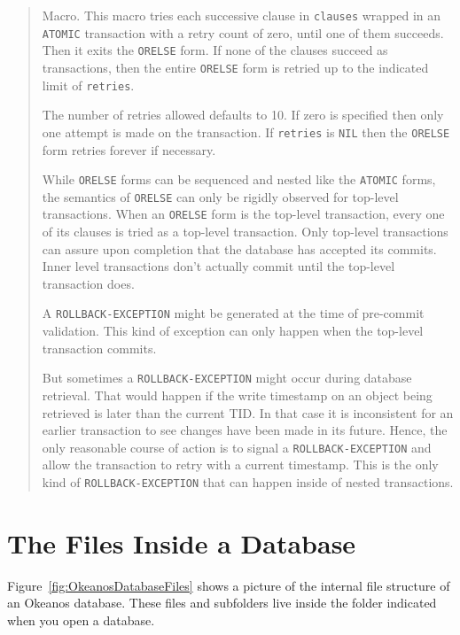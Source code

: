 \documentclass[article,oneside]{memoir}
\begin{document}
\begin{quote}

Macro. This macro tries each successive clause in \texttt{clauses} wrapped in an \texttt{ATOMIC} transaction with a retry count of zero, until one of them succeeds. Then it exits the \texttt{ORELSE} form. If none of the clauses succeed as transactions, then the entire \texttt{ORELSE} form is retried up to the indicated limit of \texttt{retries}.

The number of retries allowed defaults to 10. If zero is specified then only one attempt is made on the transaction. If \texttt{retries} is \texttt{NIL} then the \texttt{ORELSE} form retries forever if necessary.

While \texttt{ORELSE} forms can be sequenced and nested like the \texttt{ATOMIC} forms, the semantics of \texttt{ORELSE} can only be rigidly observed for top-level transactions. When an \texttt{ORELSE} form is the top-level transaction, every one of its clauses is tried as a top-level transaction. Only top-level transactions can assure upon completion that the database has accepted its commits. Inner level transactions don't actually commit until the top-level transaction does.

A \texttt{ROLLBACK-EXCEPTION} might be generated at the time of pre-commit validation. This kind of exception can only happen when the top-level transaction commits. 

But sometimes a  \texttt{ROLLBACK-EXCEPTION} might occur during database retrieval. That would happen if the write timestamp on an object being retrieved is later than the current TID. In that case it is inconsistent for an earlier transaction to see changes have been made in its future. Hence, the only reasonable course of action is to signal a \texttt{ROLLBACK-EXCEPTION} and allow the transaction to retry with a current timestamp. This is the only kind of \texttt{ROLLBACK-EXCEPTION} that can happen inside of nested transactions.
\end{quote}

\chapter{The Files Inside a Database}
Figure~\ref{fig:OkeanosDatabaseFiles} shows a picture of the internal file structure of an Okeanos database. These files and subfolders live inside the folder indicated when you open a database.
\end{document}
